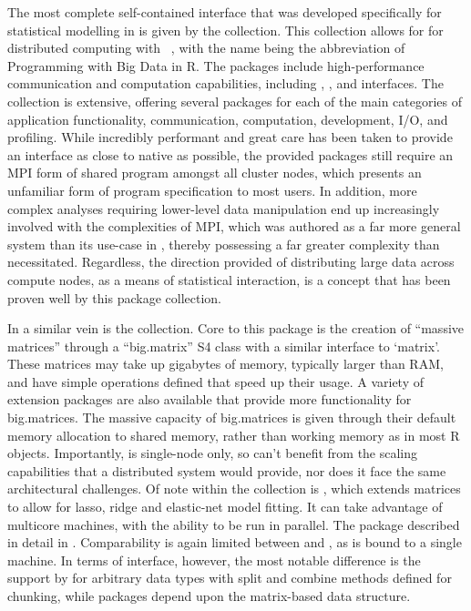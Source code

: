 \documentclass[letterpaper, inpress]{jds} %
\begin{document}
The most complete self-contained interface that was developed specifically for statistical modelling in  is given by the  collection.
This collection allows for for distributed computing with ~\citep{pbdBASEpackage}, with the name being the abbreviation of Programming with Big Data in R.
The packages include high-performance communication and computation capabilities, including , , and  interfaces.
The collection is extensive, offering several packages for each of the main categories of application functionality, communication, computation, development, I/O, and profiling.
While incredibly performant and great care has been taken to provide an interface as close to native  as possible, the provided packages still require an MPI form of shared program amongst all cluster nodes, which presents an unfamiliar form of program specification to most  users.
In addition, more complex analyses requiring lower-level data manipulation end up increasingly involved with the complexities of MPI, which was authored as a far more general system than its use-case in , thereby possessing a far greater complexity than necessitated.
Regardless, the direction provided of distributing large data across compute nodes, as a means of statistical interaction, is a concept that has been proven well by this package collection.

In a similar vein is the  collection.
Core to this package is the creation of ``massive matrices'' through a ``big.matrix'' S4 class with a similar interface to `matrix'\citep{kane13:bigmemory}.
These matrices may take up gigabytes of memory, typically larger than RAM, and have simple operations defined that speed up their usage.
A variety of extension packages are also available that provide more functionality for big.matrices.
The massive capacity of big.matrices is given through their default memory allocation to shared memory, rather than working memory as in most R objects.
Importantly,  is single-node only, so can't benefit from the scaling capabilities that a distributed system would provide, nor does it face the same architectural challenges.
Of note within the  collection is , which extends  matrices to allow for lasso, ridge and elastic-net model fitting.
It can take advantage of multicore machines, with the ability to be run in parallel. The package  described in detail in \citet{zeng2017biglasso}.
Comparability is again limited between  and , as  is bound to a single machine.
In terms of interface, however, the most notable difference is the support by  for arbitrary data types with split and combine methods defined for chunking, while  packages depend upon the matrix-based data structure.
\end{document}
